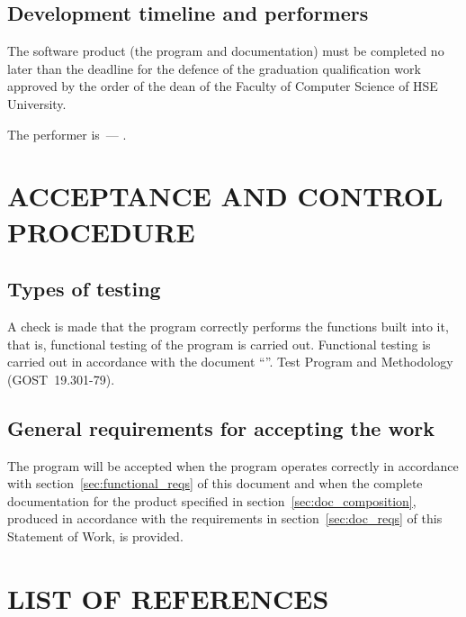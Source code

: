 \documentclass[12pt,a4paper]{extarticle}
\begin{document}
\subsection{Development timeline and performers}

The software product (the program and documentation) must be completed no later than the deadline for the defence of the graduation qualification work approved by the order of the dean of the Faculty of Computer Science of HSE University.

The performer is~--- \hseAuthorName.

\clearpage

\section{ACCEPTANCE AND CONTROL PROCEDURE}

\subsection{Types of testing}

A check is made that the program correctly performs the functions built into it, that is, functional testing of the program is carried out. Functional testing is carried out in accordance with the document \enquote{\projectname}. Test Program and Methodology (GOST~19.301-79).

\subsection{General requirements for accepting the work}

The program will be accepted when the program operates correctly in accordance with section~\ref{sec:functional_reqs} of this document and when the complete documentation for the product specified in section~\ref{sec:doc_composition}, produced in accordance with the requirements in section~\ref{sec:doc_reqs} of this Statement of Work, is provided.

\clearpage
\pagestyle{appendix}

\section*{LIST OF REFERENCES}
\end{document}
